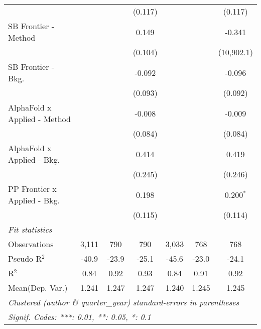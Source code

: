 \begin{tabular}{lcccccc}
                                &               &              & (0.117)       &               &              & (0.117)\\   
   SB Frontier - Method         &               &              & 0.149         &               &              & -0.341\\   
                                &               &              & (0.104)       &               &              & (10,902.1)\\   
   SB Frontier - Bkg.           &               &              & -0.092        &               &              & -0.096\\   
                                &               &              & (0.093)       &               &              & (0.092)\\   
   AlphaFold x Applied - Method &               &              & -0.008        &               &              & -0.009\\   
                                &               &              & (0.084)       &               &              & (0.084)\\   
   AlphaFold x Applied - Bkg.   &               &              & 0.414         &               &              & 0.419\\   
                                &               &              & (0.245)       &               &              & (0.246)\\   
   PP Frontier x Applied - Bkg. &               &              & 0.198         &               &              & 0.200$^{*}$\\   
                                &               &              & (0.115)       &               &              & (0.114)\\   
   \midrule
   \emph{Fit statistics}\\
   Observations                 & 3,111         & 790          & 790           & 3,033         & 768          & 768\\  
   Pseudo R$^2$                 & -40.9         & -23.9        & -25.1         & -45.6         & -23.0        & -24.1\\  
   R$^2$                        & 0.84          & 0.92         & 0.93          & 0.84          & 0.91         & 0.92\\  
Mean(Dep. Var.) & 1.241 & 1.247 & 1.247 & 1.240 & 1.245 & 1.245 \\
   \midrule \midrule
   \multicolumn{7}{l}{\emph{Clustered (author \& quarter\_year) standard-errors in parentheses}}\\
   \multicolumn{7}{l}{\emph{Signif. Codes: ***: 0.01, **: 0.05, *: 0.1}}\\
\end{tabular}
\par\endgroup
